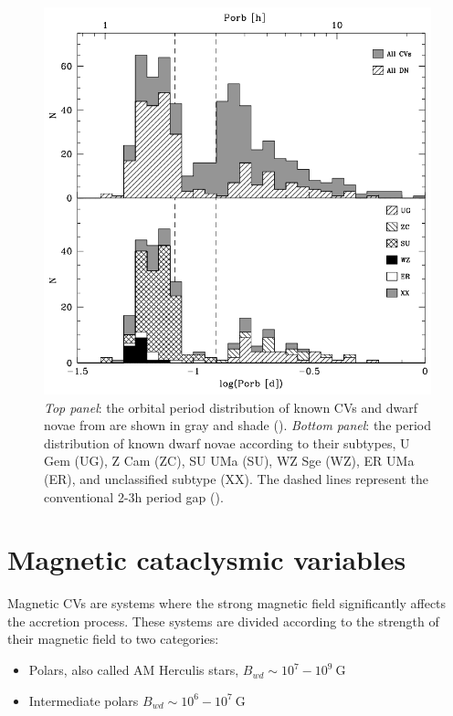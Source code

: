 \documentclass[oneside,a4paper,11pt]{report}
\begin{document}
\begin{figure}[hbt!]
\centering
\includegraphics[totalheight=12.5cm]{plot/cv_orbper.png}
\caption{\textit{Top panel}: the orbital period distribution of known CVs and dwarf novae from are shown in gray and 
shade (\citet{2003A&A...404..301R}). \textit{Bottom panel}: the period distribution of known dwarf novae according to their subtypes, U Gem (UG), 
Z Cam (ZC), SU UMa (SU), WZ Sge (WZ), ER UMa (ER), and unclassified subtype (XX). The dashed lines represent the conventional 
2-3h period gap (\citet{Aungwerojwit}).}
\label{cv_orb1} 
\end{figure}

\section{Magnetic cataclysmic variables}
Magnetic CVs are systems where the strong magnetic field significantly affects the accretion process. These systems are divided 
according to the strength of their magnetic field to two categories: 
\begin{itemize}
 \item Polars, also called AM Herculis stars, $B_{wd} \sim 10^7 - 10^9\: \mathrm{G}$  
 \item Intermediate polars $B_{wd} \sim 10^6 - 10^7 \: \mathrm{G}$
\end{itemize}
\end{document}
